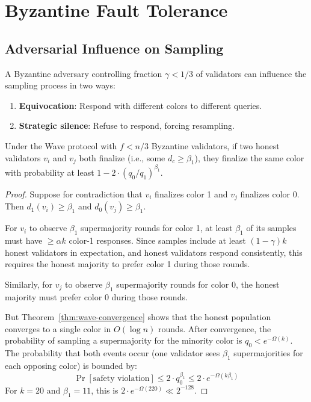 \section{Byzantine Fault Tolerance}

\label{sec:wave-byzantine}

\subsection{Adversarial Influence on Sampling}

A Byzantine adversary controlling fraction $\gamma < 1/3$ of validators can influence
the sampling process in two ways:
\begin{enumerate}[nosep]
\item \textbf{Equivocation}: Respond with different colors to different queries.
\item \textbf{Strategic silence}: Refuse to respond, forcing resampling.
\end{enumerate}

\begin{theorem}
\label{thm:wave-byz-safety}
Under the Wave protocol with $f < n/3$ Byzantine validators, if two honest validators
$v_i$ and $v_j$ both finalize (i.e., some $d_c \geq \beta_1$), they finalize the same
color with probability at least $1 - 2 \cdot (q_0/q_1)^{\beta_1}$.
\end{theorem}

\begin{proof}
Suppose for contradiction that $v_i$ finalizes color 1 and $v_j$ finalizes color 0.
Then $d_1(v_i) \geq \beta_1$ and $d_0(v_j) \geq \beta_1$.

For $v_i$ to observe $\beta_1$ supermajority rounds for color 1, at least $\beta_1$ of
its samples must have $\geq \alpha k$ color-1 responses. Since samples include at least
$(1-\gamma)k$ honest validators in expectation, and honest validators respond consistently,
this requires the honest majority to prefer color 1 during those rounds.

Similarly, for $v_j$ to observe $\beta_1$ supermajority rounds for color 0, the honest
majority must prefer color 0 during those rounds.

But Theorem~\ref{thm:wave-convergence} shows that the honest population converges to a single
color in $O(\log n)$ rounds. After convergence, the probability of sampling a supermajority
for the minority color is $q_0 < e^{-\Omega(k)}$. The probability that both events occur
(one validator sees $\beta_1$ supermajorities for each opposing color) is bounded by:
\[
\Pr[\text{safety violation}] \leq 2 \cdot q_0^{\beta_1} \leq 2 \cdot e^{-\Omega(k \beta_1)}
\]
For $k = 20$ and $\beta_1 = 11$, this is $2 \cdot e^{-\Omega(220)} \ll 2^{-128}$.
\end{proof}

